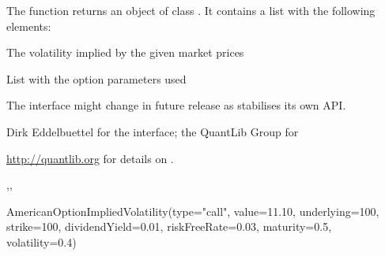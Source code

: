 \begin{Value}
The  function returns an object
of class . It contains a list with the
following elements:
\begin{ldescription}
\item[\code{impliedVol}] The volatility implied by the given market prices
\item[\code{parameters}] List with the option parameters used
\end{ldescription}
\end{Value}
\begin{Note}\relax
The interface might change in future release as 
stabilises its own API.
\end{Note}
\begin{Author}\relax
Dirk Eddelbuettel  for the \R{} interface;
the QuantLib Group for 
\end{Author}
\begin{References}\relax
\url{http://quantlib.org} for details on .
\end{References}
\begin{SeeAlso}\relax
{},,
\end{SeeAlso}
\begin{Examples}
\begin{ExampleCode}
AmericanOptionImpliedVolatility(type="call", value=11.10, underlying=100,
        strike=100, dividendYield=0.01, riskFreeRate=0.03,
        maturity=0.5, volatility=0.4)
\end{ExampleCode}
\end{Examples}

